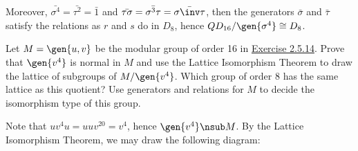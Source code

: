 \begin{problems}
\begin{sol}
\begin{center}
        \end{center}
        Moreover, $\bar{\sigma^4} = \bar{\tau^2} = \bar 1$ and $\bar{\tau\sigma} = \bar{\sigma^3\tau} = \bar{\sigma\inv\tau}$, then the generators $\bar\sigma$ and $\bar\tau$ satisfy the relations as $r$ and $s$ do in $D_8$, hence $QD_{16}/\gen{\sigma^4} \cong D_8$.
    \end{sol}
    \item Let $M = \gen{u, v}$ be the modular group of order 16 in \hyperref[ex2.5.14]{Exercise 2.5.14}. Prove that $\gen{v^4}$ is normal in $M$ and use the Lattice Isomorphism Theorem to draw the lattice of subgroups of $M/\gen{v^4}$. Which group of order 8 has the same lattice as this quotient? Use generators and relations for $M$ to decide the isomorphism type of this group.
    \begin{sol}
        Note that $uv^4u = uuv^{20} = v^4$, hence $\gen{v^4} \nsub M$. By the Lattice Isomorphism Theorem, we may draw the following diagram:
        \begin{center}
\end{center}
\end{sol}
\end{problems}
